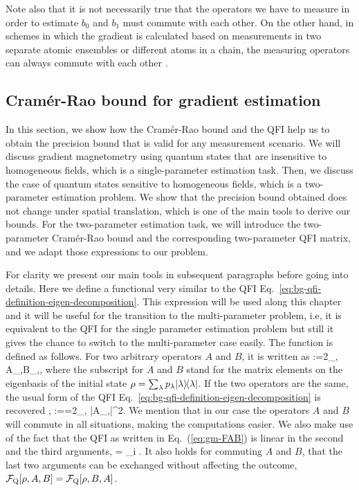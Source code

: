 Note also that it is not necessarily true that the operators we have to measure in order to estimate $b_0$ and $b_1$ must commute with each other.
On the other hand, in schemes in which the gradient is calculated based on measurements in two separate atomic ensembles or different atoms in a chain, the measuring operators can always commute with each other \cite{Wasilewski2010, Eckert2006, Zhang2014}.

\subsection{Cram\'er-Rao bound for gradient estimation}
\label{sec:gm-cramer-rao-bounds}

In this section, we show how the Cram\'er-Rao bound and the QFI help us to obtain the precision bound that is valid for any measurement scenario.
We will discuss gradient magnetometry using quantum states that are insensitive to homogeneous fields, which is a single-parameter estimation task.
Then, we discuss the case of quantum states sensitive to homogeneous fields, which is a two-parameter estimation problem.
We show that the precision bound obtained does not change under spatial translation, which is one of the main tools to derive our bounds.
For the two-parameter estimation task, we will introduce the two-parameter Cram\'er-Rao bound and the corresponding two-parameter QFI matrix, and we adapt those expressions to our problem.

For clarity we present our main tools in subsequent paragraphs before going into details.
Here we define a functional very similar to the QFI Eq.~\eqref{eq:bg-qfi-definition-eigen-decomposition}.
This expression will be used along this chapter and it will be useful for the transition to the multi-parameter problem, i.e, it is equivalent to the QFI for the single parameter estimation problem but still it gives the chance to switch to the multi-parameter case easily.
The function is defined as follows.
For two arbitrary operators $A$ and $B$, it is written as
\be
  \label{eq:gm-FAB}
  :=2\sum_{\lambda,\nu}
  {A}_{\lambda,\nu}{B}_{\nu,\lambda},
\ee
where the subscript for $A$ and $B$ stand for the matrix elements on the eigenbasis of the initial state $\rho = \sum_\lambda p_\lambda\vert{\lambda}\rangle{\!}\langle{\lambda}\vert$.
If the two operators are the same, the usual form of the QFI Eq.~\eqref{eq:bg-qfi-definition-eigen-decomposition} is recovered \cite{Paris2009, Braunstein1994, Holevo1982, Helstrom1976, Petz2002, Petz2008},
\be
  :==2\sum_{\lambda,\nu}
   |{A}_{\lambda,\nu}|^2.
\ee
We mention that in our case the operators $A$ and $B$ will commute in all situations, making the computations easier.
We also make use of the fact that the QFI as written in Eq.~(\ref{eq:gm-FAB}) is linear in the second and the third arguments,
\be
  \label{eq:gm-qfi-linear-in-arguments}
   = \sum_i .
\ee
It also holds for commuting $A$ and $B$, that the last two arguments can be exchanged without affecting the outcome, $\mathcal{F}_{\textnormal{Q}}[{\textstyle \rho, A, B}] = \mathcal{F}_{\textnormal{Q}}[{\textstyle \rho, B,A}]$.

